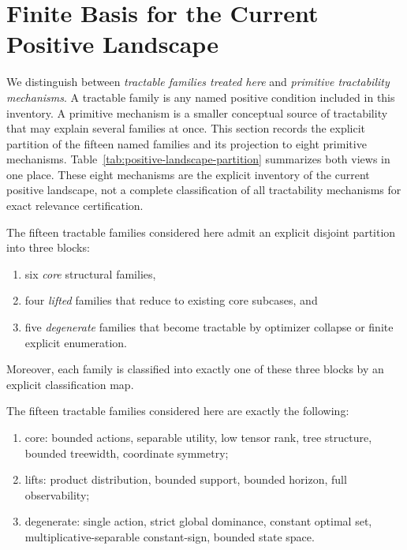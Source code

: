 \section{Finite Basis for the Current Positive Landscape}

We distinguish between \emph{tractable families treated here} and \emph{primitive tractability mechanisms}. A tractable family is any named positive condition included in this inventory. A primitive mechanism is a smaller conceptual source of tractability that may explain several families at once. This section records the explicit partition of the fifteen named families and its projection to eight primitive mechanisms. Table~\ref{tab:positive-landscape-partition} summarizes both views in one place. These eight mechanisms are the explicit inventory of the current positive landscape, not a complete classification of all tractability mechanisms for exact relevance certification.

\begin{theorem}\label{thm:current-landscape-partition}
The fifteen tractable families considered here admit an explicit disjoint partition into three blocks:
\begin{enumerate}
\item six \emph{core} structural families,
\item four \emph{lifted} families that reduce to existing core subcases, and
\item five \emph{degenerate} families that become tractable by optimizer collapse or finite explicit enumeration.
\end{enumerate}
Moreover, each family is classified into exactly one of these three blocks by an explicit classification map.
\end{theorem}

\begin{proposition}\label{prop:explicit-inventory}
The fifteen tractable families considered here are exactly the following:
\begin{enumerate}
\item core: bounded actions, separable utility, low tensor rank, tree structure, bounded treewidth, coordinate symmetry;
\item lifts: product distribution, bounded support, bounded horizon, full observability;
\item degenerate: single action, strict global dominance, constant optimal set, multiplicative-separable constant-sign, bounded state space.
\end{enumerate}
\end{proposition}

